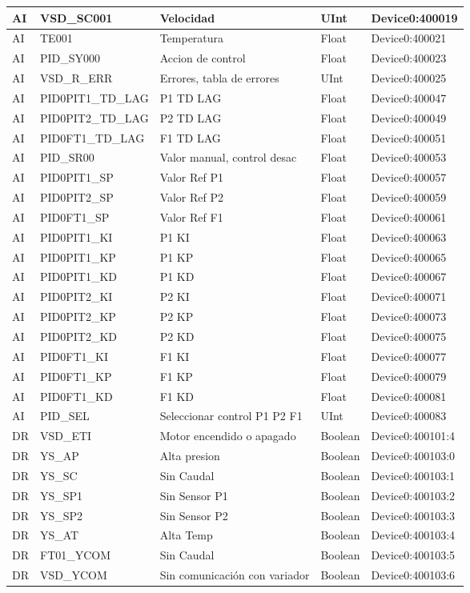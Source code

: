 \begin{longtable}{|p{1.2cm} |p{4cm} |p{4cm} |p{1.5cm} |p{3.2cm} |}
	AI & VSD\_SC001 & Velocidad & UInt & Device0:400019 \\ \hline
	AI & TE001 & Temperatura & Float & Device0:400021 \\ \hline
	AI & PID\_SY000 & Accion de control & Float & Device0:400023 \\ \hline
	AI & VSD\_R\_ERR & Errores, tabla de errores & UInt & Device0:400025 \\ \hline
	AI & PID0PIT1\_TD\_LAG & P1 TD LAG & Float & Device0:400047 \\ \hline
	AI & PID0PIT2\_TD\_LAG & P2 TD LAG & Float & Device0:400049 \\ \hline
	AI & PID0FT1\_TD\_LAG & F1 TD LAG & Float & Device0:400051 \\ \hline
	AI & PID\_SR00 & Valor manual, control desac & Float & Device0:400053 \\ \hline
	AI & PID0PIT1\_SP & Valor Ref P1 & Float & Device0:400057 \\ \hline
	AI & PID0PIT2\_SP & Valor Ref P2 & Float & Device0:400059 \\ \hline
	AI & PID0FT1\_SP & Valor Ref F1 & Float & Device0:400061 \\ \hline
	AI & PID0PIT1\_KI & P1 KI & Float & Device0:400063 \\ \hline
	AI & PID0PIT1\_KP & P1 KP & Float & Device0:400065 \\ \hline
	AI & PID0PIT1\_KD & P1 KD & Float & Device0:400067 \\ \hline
	AI & PID0PIT2\_KI & P2 KI & Float & Device0:400071 \\ \hline
	AI & PID0PIT2\_KP & P2 KP & Float & Device0:400073 \\ \hline
	AI & PID0PIT2\_KD & P2 KD & Float & Device0:400075 \\ \hline
	AI & PID0FT1\_KI & F1 KI & Float & Device0:400077 \\ \hline
	AI & PID0FT1\_KP & F1 KP & Float & Device0:400079 \\ \hline
	AI & PID0FT1\_KD & F1 KD & Float & Device0:400081 \\ \hline
	AI & PID\_SEL & Seleccionar control P1 P2 F1 & UInt & Device0:400083 \\ \hline
	DR & VSD\_ETI & Motor encendido o apagado & Boolean & Device0:400101:4 \\ \hline
	DR & YS\_AP & Alta presion & Boolean & Device0:400103:0 \\ \hline
	DR & YS\_SC & Sin Caudal & Boolean & Device0:400103:1 \\ \hline
	DR & YS\_SP1 & Sin Sensor P1 & Boolean & Device0:400103:2 \\ \hline
	DR & YS\_SP2 & Sin Sensor P2 & Boolean & Device0:400103:3 \\ \hline
	DR & YS\_AT & Alta Temp & Boolean & Device0:400103:4 \\ \hline
	DR & FT01\_YCOM & Sin Caudal & Boolean & Device0:400103:5 \\ \hline
	DR & VSD\_YCOM & Sin comunicación con variador & Boolean & Device0:400103:6 \\ \hline
	

\end{longtable}

